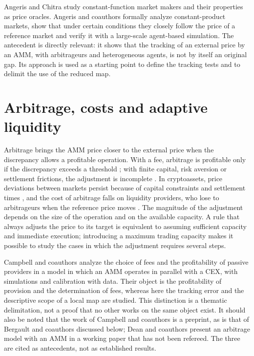 Angeris and Chitra \cite{angeris2020cfmm} study constant-function market makers and their properties as price oracles. Angeris and coauthors \cite{angeris2020uniswap} formally analyze constant-product markets, show that under certain conditions they closely follow the price of a reference market and verify it with a large-scale agent-based simulation. The antecedent is directly relevant: it shows that the tracking of an external price by an AMM, with arbitrageurs and heterogeneous agents, is not by itself an original gap. Its approach is used as a starting point to define the tracking tests and to delimit the use of the reduced map.

\section{Arbitrage, costs and adaptive liquidity}

Arbitrage brings the AMM price closer to the external price when the discrepancy allows a profitable operation. With a fee, arbitrage is profitable only if the discrepancy exceeds a threshold \cite{milionis2025fees}; with finite capital, risk aversion or settlement frictions, the adjustment is incomplete \cite{shleifer1997limits}. In cryptoassets, price deviations between markets persist because of capital constraints and settlement times \cite{makarov2020trading,hautsch2024building}, and the cost of arbitrage falls on liquidity providers, who lose to arbitrageurs when the reference price moves \cite{milionis2022lvr}. The magnitude of the adjustment depends on the size of the operation and on the available capacity. A rule that always adjusts the price to its target is equivalent to assuming sufficient capacity and immediate execution; introducing a maximum trading capacity makes it possible to study the cases in which the adjustment requires several steps.

Campbell and coauthors \cite{campbell2025optimal} analyze the choice of fees and the profitability of passive providers in a model in which an AMM operates in parallel with a CEX, with simulations and calibration with data. Their object is the profitability of provision and the determination of fees, whereas here the tracking error and the descriptive scope of a local map are studied. This distinction is a thematic delimitation, not a proof that no other works on the same object exist. It should also be noted that the work of Campbell and coauthors is a preprint, as is that of Bergault and coauthors \cite{bergault2025exit} discussed below; Dean and coauthors \cite{dean2022arbitrage} present an arbitrage model with an AMM in a working paper that has not been refereed. The three are cited as antecedents, not as established results.

